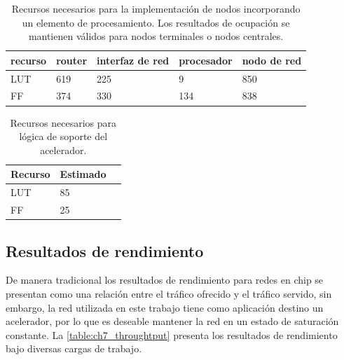 \begin{table}[]
	\centering
		\begin{tabular}{lllll}
			recurso & router & interfaz de red & procesador & nodo de red \\\hline
			LUT     & 619    & 225             & 9          & 850         \\
			FF      & 374    & 330             & 134        & 838        
		\end{tabular}
	\caption{Recursos necesarios para la implementación de nodos incorporando un elemento de procesamiento. Los resultados de ocupación se mantienen válidos para nodos terminales o nodos centrales.}
	\label{table:ch7_nodo_procesamiento_ocu}
\end{table}

\begin{table}[]
	\centering
		\begin{tabular}{lll}
			Recurso & Estimado &  \\\hline
			LUT     & 85       &  \\
			FF      & 25       &  \\
		\end{tabular}
	\caption{Recursos necesarios para lógica de soporte del acelerador.}
	\label{table:ch7_nodo_frontera_ocu}
\end{table}



\subsection{Resultados de rendimiento}
	\label{ch7_resultados_de_rendimiento}

De manera tradicional los resultados de rendimiento para redes en chip se presentan como una relación entre el tráfico ofrecido y el tráfico servido, sin embargo, la red utilizada en este trabajo tiene como aplicación destino un acelerador, por lo que es deseable mantener la red en un estado de saturación constante. La \ref{table:ch7_throughtput} presenta los resultados de rendimiento bajo diversas cargas de trabajo.


